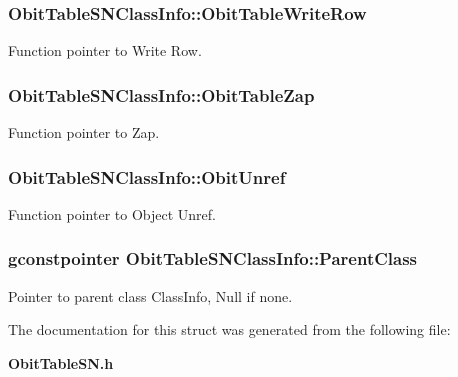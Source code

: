 \subsubsection{ {\bf Obit\-Table\-SNClass\-Info::Obit\-Table\-Write\-Row}}\label{structObitTableSNClassInfo_o26}


Function pointer to Write Row. 

\subsubsection{ {\bf Obit\-Table\-SNClass\-Info::Obit\-Table\-Zap}}\label{structObitTableSNClassInfo_o19}


Function pointer to Zap. 

\subsubsection{ {\bf Obit\-Table\-SNClass\-Info::Obit\-Unref}}\label{structObitTableSNClassInfo_o11}


Function pointer to Object Unref. 

\subsubsection{\setlength{\rightskip}{0pt plus 5cm}gconstpointer {\bf Obit\-Table\-SNClass\-Info::Parent\-Class}}\label{structObitTableSNClassInfo_o3}


Pointer to parent class Class\-Info, Null if none. 



The documentation for this struct was generated from the following file:\begin{CompactItemize}
\item 
{\bf Obit\-Table\-SN.h}\end{CompactItemize}
